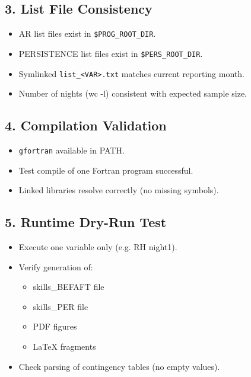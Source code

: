 \documentclass[a4paper,11pt]{article}
\begin{document}
\subsection{3. List File Consistency}

\begin{itemize}
    \item [ ] AR list files exist in \texttt{\$PROG\_ROOT\_DIR}.
    \item [ ] PERSISTENCE list files exist in \texttt{\$PERS\_ROOT\_DIR}.
    \item [ ] Symlinked \texttt{list\_<VAR>.txt} matches current reporting month.
    \item [ ] Number of nights (wc -l) consistent with expected sample size.
\end{itemize}

\subsection{4. Compilation Validation}

\begin{itemize}
    \item [ ] \texttt{gfortran} available in PATH.
    \item [ ] Test compile of one Fortran program successful.
    \item [ ] Linked libraries resolve correctly (no missing symbols).
\end{itemize}

\subsection{5. Runtime Dry-Run Test}

\begin{itemize}
    \item [ ] Execute one variable only (e.g. RH night1).
    \item [ ] Verify generation of:
        \begin{itemize}
            \item [ ] skills\_BEFAFT file
            \item [ ] skills\_PER file
            \item [ ] PDF figures
            \item [ ] LaTeX fragments
        \end{itemize}
    \item [ ] Check parsing of contingency tables (no empty values).
\end{itemize}
\end{document}
